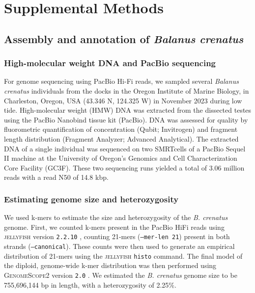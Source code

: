 \documentclass[11pt]{article}
\begin{document}



\pagebreak


\section*{Supplemental Methods}

\subsection*{Assembly and annotation of \textit{Balanus crenatus}}\label{sec:sup_methods_balcre}

\subsubsection*{High-molecular weight DNA and PacBio sequencing}

For genome sequencing using PacBio Hi-Fi reads, we sampled several \textit{Balanus
crenatus} individuals from the docks in the Oregon Institute of Marine Biology, in
Charleston, Oregon, USA (43.346 N, 124.325 W) in November 2023 during low tide.
High-molecular weight (HMW) DNA was extracted from the dissected testes using the 
PacBio Nanobind tissue kit (PacBio).
DNA was assessed for quality by fluorometric quantification of concentration (Qubit;
Invitrogen) and fragment length distribution (Fragment Analyzer; Advanced Analytical).
The extracted DNA of a single individual was sequenced on two SMRTcells of a PacBio
Sequel II machine at the University of Oregon's Genomics and Cell Characterization
Core Facility (GC3F).
These two sequencing runs yielded a total of 3.06 million reads with a read N50 of
14.8 kbp.

\subsubsection*{Estimating genome size and heterozygosity}

We used k-mers to estimate the size and heterozygosity of the \textit{B.
crenatus} genome.
First, we counted k-mers present in the PacBio HiFi reads using
\textsc{jellyfish} version \texttt{2.2.10} \citep{marcais_fast_2011}, counting
21-mers (\texttt{--mer-len 21}) present in both strands (\texttt{--canonical}).
These counts were then used to generate an empirical distribution of 21-mers
using the \textsc{jellyfish} \texttt{histo} command.
The final model of the diploid, genome-wide k-mer distribution was then performed
using \textsc{GenomeScope2} version \texttt{2.0}
\citep{ranallo-benavidez_genomescope_2020}.
We estimated the \textit{B. crenatus} genome size to be 755,696,144 bp in length,
with a heterozygosity of 2.25\%.
\end{document}

